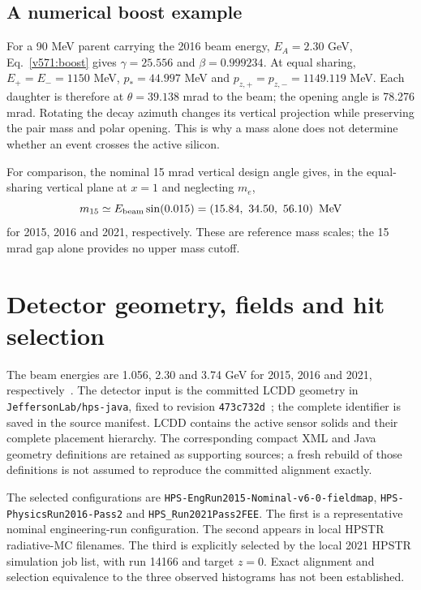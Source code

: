 \subsection{A numerical boost example}
For a 90 MeV parent carrying the 2016 beam energy, $E_A=2.30$ GeV,
Eq.~\eqref{v571:boost} gives $\gamma=25.556$ and $\beta=0.999234$.
At equal sharing, $E_+=E_-=1150$ MeV, $p_*=44.997$ MeV and
$p_{z,+}=p_{z,-}=1149.119$ MeV. Each daughter is therefore at
$\theta=39.138$ mrad to the beam; the opening angle is 78.276 mrad.
Rotating the decay azimuth changes its vertical projection while preserving
the pair mass and polar opening. This is why a mass alone does not determine
whether an event crosses the active silicon.

For comparison, the nominal 15 mrad vertical design angle gives, in the
equal-sharing vertical plane at $x=1$ and neglecting $m_e$,
\begin{equation}
 m_{15}\simeq E_{\rm beam}\sin(0.015)
   =\left(15.84,\ 34.50,\ 56.10\right)\ {\rm MeV}
 \label{v571:fifteen-mrad-reference}
\end{equation}
for 2015, 2016 and 2021, respectively. These are reference mass scales;
the 15 mrad gap alone provides no upper mass cutoff.

\section{Detector geometry, fields and hit selection}
\label{v571:geometry}
The beam energies are 1.056, 2.30 and 3.74 GeV for 2015, 2016 and 2021,
respectively~\cite{v571:HPS2022,v571:HPS2015,v571:HPS2016}.
The detector input is the committed LCDD geometry in
\texttt{JeffersonLab/hps-java}, fixed to revision
\texttt{473c732d}~\cite{v571:geometry-source}; the complete identifier is saved
in the source manifest.
LCDD contains the active sensor solids and their complete placement hierarchy.
The corresponding compact XML and Java geometry definitions are retained as
supporting sources; a fresh rebuild of those definitions is not assumed to
reproduce the committed alignment exactly.

The selected configurations are
\texttt{HPS-EngRun2015-Nominal-v6-0-fieldmap},
\texttt{HPS-PhysicsRun2016-Pass2} and
\texttt{HPS\_Run2021Pass2FEE}. The first is a representative nominal
engineering-run configuration. The second appears in local HPSTR radiative-MC
filenames. The third is explicitly selected by the local 2021 HPSTR simulation
job list, with run 14166 and target $z=0$. Exact alignment and selection
equivalence to the three observed histograms has not been established.

